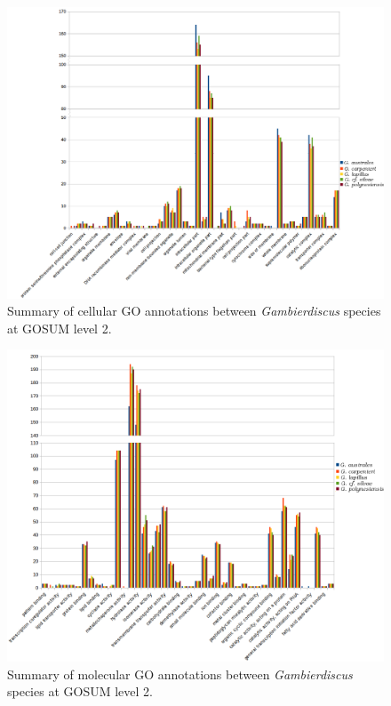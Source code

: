 \documentclass[12pt]{article}
\begin{document}
\begin{figure} 
\includegraphics[scale=.6]{3Aug18_cluster-investigation/figures/gosum-species/Species-gosum2-cell2-split.png} 
\caption{Summary of cellular GO annotations between \textit{Gambierdiscus} species at GOSUM level 2.}%
\label{fig:SpecGo2Cell}
\end{figure} 


\begin{figure} 
\includegraphics[scale=.6]{3Aug18_cluster-investigation/figures/gosum-species/Species-gosum2-molec-split.png} 
\caption{Summary of molecular GO annotations between \textit{Gambierdiscus} species at GOSUM level 2.}%
\label{fig:SpecGo2Molec}
\end{figure} 
\end{document}
